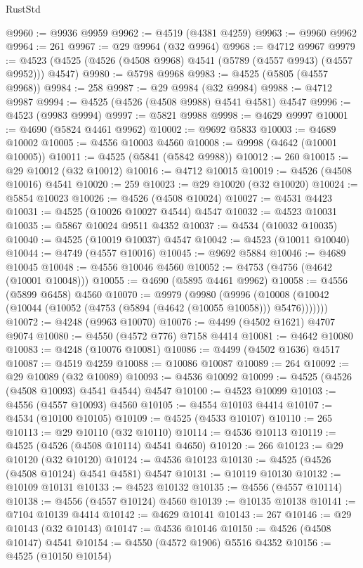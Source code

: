 \begin{lexlean}{RustStd}
\begin{coremodule}
{\begin{coremodule}
{{{{{{{{{{{{{{{{{{{{{{{{{{{{{{{{{{{{{{{{{{{{{{{{{{{{{{{@9960 := @9936 @9959
@9962 := @4519 (@4381 @4259)
@9963 := @9960 @9962
@9964 := 261
@9967 := @29 @9964 (@32 @9964)
@9968 := @4712 @9967
@9979 := @4523 (@4525 (@4526 (@4508 @9968) @4541 (@5789 (@4557 @9943) (@4557 @9952))) @4547)
@9980 := @5798 @9968
@9983 := @4525 (@5805 (@4557 @9968))
@9984 := 258
@9987 := @29 @9984 (@32 @9984)
@9988 := @4712 @9987
@9994 := @4525 (@4526 (@4508 @9988) @4541 @4581) @4547
@9996 := @4523 (@9983 @9994)
@9997 := @5821 @9988
@9998 := @4629 @9997
@10001 := @4690 (@5824 @4461 @9962)
@10002 := @9692 @5833
@10003 := @4689 @10002
@10005 := @4556 @10003 @4560
@10008 := @9998 (@4642 (@10001 @10005))
@10011 := @4525 (@5841 (@5842 @9988))
@10012 := 260
@10015 := @29 @10012 (@32 @10012)
@10016 := @4712 @10015
@10019 := @4526 (@4508 @10016) @4541
@10020 := 259
@10023 := @29 @10020 (@32 @10020)
@10024 := @5854 @10023
@10026 := @4526 (@4508 @10024)
@10027 := @4531 @4423
@10031 := @4525 (@10026 @10027 @4544) @4547
@10032 := @4523 @10031
@10035 := @5867 @10024 @9511 @4352
@10037 := @4534 (@10032 @10035)
@10040 := @4525 (@10019 @10037) @4547
@10042 := @4523 (@10011 @10040)
@10044 := @4749 (@4557 @10016)
@10045 := @9692 @5884
@10046 := @4689 @10045
@10048 := @4556 @10046 @4560
@10052 := @4753 (@4756 (@4642 (@10001 @10048)))
@10055 := @4690 (@5895 @4461 @9962)
@10058 := @4556 (@5899 @6458) @4560
@10070 := @9979
    (@9980
      (@9996 (@10008 (@10042 (@10044 (@10052 (@4753 (@5894 (@4642 (@10055 @10058))) @5476)))))))
@10072 := @4248 (@9963 @10070)
@10076 := @4499 (@4502 @1621) @4707 @9074
@10080 := @4550 (@4572 @776) @7158 @4414
@10081 := @4642 @10080
@10083 := @4248 (@10076 @10081)
@10086 := @4499 (@4502 @1636) @4517
@10087 := @4519 @4259
@10088 := @10086 @10087
@10089 := 264
@10092 := @29 @10089 (@32 @10089)
@10093 := @4536 @10092
@10099 := @4525 (@4526 (@4508 @10093) @4541 @4544) @4547
@10100 := @4523 @10099
@10103 := @4556 (@4557 @10093) @4560
@10105 := @4554 @10103 @4414
@10107 := @4534 (@10100 @10105)
@10109 := @4525 (@4533 @10107)
@10110 := 265
@10113 := @29 @10110 (@32 @10110)
@10114 := @4536 @10113
@10119 := @4525 (@4526 (@4508 @10114) @4541 @4650)
@10120 := 266
@10123 := @29 @10120 (@32 @10120)
@10124 := @4536 @10123
@10130 := @4525 (@4526 (@4508 @10124) @4541 @4581) @4547
@10131 := @10119 @10130
@10132 := @10109 @10131
@10133 := @4523 @10132
@10135 := @4556 (@4557 @10114)
@10138 := @4556 (@4557 @10124) @4560
@10139 := @10135 @10138
@10141 := @7104 @10139 @4414
@10142 := @4629 @10141
@10143 := 267
@10146 := @29 @10143 (@32 @10143)
@10147 := @4536 @10146
@10150 := @4526 (@4508 @10147) @4541
@10154 := @4550 (@4572 @1906) @5516 @4352
@10156 := @4525 (@10150 @10154)
}}}}}}}}}}}}}}}}}}}}}}}}}}}}}}}}}}}}}}}}}}}}}}}}}}}}}}}
\end{coremodule}}
\end{coremodule}
\end{lexlean}
